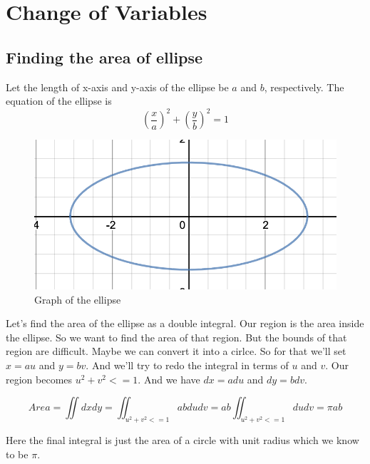 

\chapter{Change of Variables}

\bigbreak

\section{Finding the area of ellipse}

Let the length of x-axis and y-axis of the ellipse be $a$ and $b$, respectively.
The equation of the ellipse is 
$$ \left( \frac{x}{a} \right)^2 + \left( \frac{y}{b} \right)^2 = 1 $$

\begin{figure}[ht!]
    \centering
    \includegraphics[scale=0.5]{./images/lecture_14_figure_1.png}
    \caption{Graph of the ellipse}
\end{figure}

Let's find the area of the ellipse as a double integral.
Our region is the area inside the ellipse. So we want to find the area of that region.
But the bounds of that region are difficult.
Maybe we can convert it into a cirlce. So for that we'll set $x = au$ and $y = bv$.
And we'll try to redo the integral in terms of $u$ and $v$.
Our region becomes $u^2 + v^2 <= 1$. And we have $dx = adu$ and $dy = bdv$.

$$
Area = \iint dx dy = \iint_{u^2+v^2 <= 1} ab du dv = ab \iint_{u^2+v^2 <= 1} du dv = \pi a b 
$$

Here the final integral is just the area of a circle with unit radius which we know to be $\pi$.



